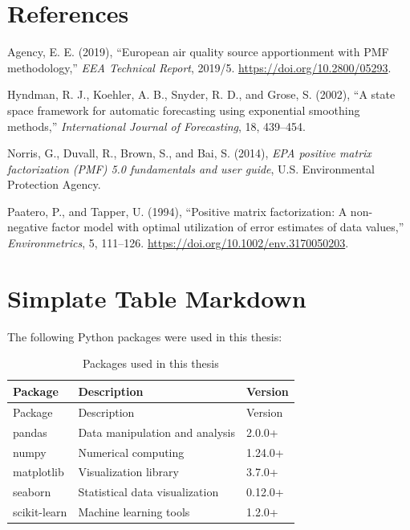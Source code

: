 \documentclass[
  letterpaper,
  oneside,
  openany]{MastersDoctoralThesis}
\newlength{\cslhangindent}
\newenvironment{CSLReferences}[2] %
 {\begin{list}{}{%
  \setlength{\itemindent}{0pt}
  \setlength{\leftmargin}{0pt}
  \setlength{\parsep}{0pt}
  \ifodd #1
   \setlength{\leftmargin}{\cslhangindent}
   \setlength{\itemindent}{-1\cslhangindent}
  \fi
  \setlength{\itemsep}{#2\baselineskip}}}
 {\end{list}}
\begin{document}

\chapter*{References}\label{references}


\label{refs}
\begin{CSLReferences}{1}{0}
Agency, E. E. (2019), {``European air quality source apportionment with
PMF methodology,''} \emph{EEA Technical Report}, 2019/5.
\url{https://doi.org/10.2800/05293}.

Hyndman, R. J., Koehler, A. B., Snyder, R. D., and Grose, S. (2002),
{``A state space framework for automatic forecasting using exponential
smoothing methods,''} \emph{International Journal of Forecasting}, 18,
439--454.

Norris, G., Duvall, R., Brown, S., and Bai, S. (2014), \emph{EPA
positive matrix factorization (PMF) 5.0 fundamentals and user guide},
U.S. Environmental Protection Agency.

Paatero, P., and Tapper, U. (1994), {``Positive matrix factorization: A
non-negative factor model with optimal utilization of error estimates of
data values,''} \emph{Environmetrics}, 5, 111--126.
\url{https://doi.org/10.1002/env.3170050203}.

\end{CSLReferences}

\cleardoublepage
{}
{}
\appendix

\chapter{Simplate Table Markdown}\label{sec-python-pkgs}

The following Python packages were used in this thesis:

\begin{longtable}[]{@{}lll@{}}
\caption{Packages used in this thesis}\label{tbl-pkgs}\tabularnewline
\toprule\noalign{}
Package & Description & Version \\
\midrule\noalign{}
\endfirsthead
\toprule\noalign{}
Package & Description & Version \\
\midrule\noalign{}
\endhead
\bottomrule\noalign{}
\endlastfoot
pandas & Data manipulation and analysis & 2.0.0+ \\
numpy & Numerical computing & 1.24.0+ \\
matplotlib & Visualization library & 3.7.0+ \\
seaborn & Statistical data visualization & 0.12.0+ \\
scikit-learn & Machine learning tools & 1.2.0+ \\
\end{longtable}
\end{document}
